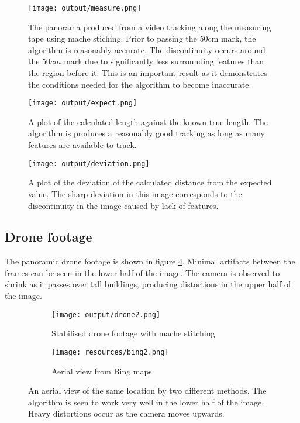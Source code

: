 \begin{figure}
  \centering
  \texttt{[image: output/measure.png]}
  \caption{The panorama produced from a video tracking along the measuring tape using mache stiching.
  Prior to passing the 50cm mark, the algorithm is reasonably accurate.
  The discontinuity occurs around the $50cm$ mark due to significantly less surrounding features than the region before it.
  This is an important result as it demonstrates the conditions needed for the algorithm to become inaccurate.}
  \label{fig:measure}
\end{figure}

\begin{figure}
  \centering
  \texttt{[image: output/expect.png]}
  \caption{A plot of the calculated length against the known true length.
  The algorithm is produces a reasonably good tracking as long as many features are available to track.}
  \label{fig:expect}
\end{figure}

\begin{figure}
  \centering
  \texttt{[image: output/deviation.png]}
  \caption{A plot of the deviation of the calculated distance from the expected value.
  The sharp deviation in this image corresponds to the discontinuity in the image caused by lack of features.}
  \label{fig:deviation}
\end{figure}

\subsection{Drone footage}

The panoramic drone footage is shown in figure \ref{fig:drone}.
Minimal artifacts between the frames can be seen in the lower half of the image.
The camera is observed to shrink as it passes over tall buildings,
producing distortions in the upper half of the image. 

\begin{figure}
  \centering
  \begin{subfigure}[b]{0.7\textwidth}
    \texttt{[image: output/drone2.png]}
    \caption{Stabilised drone footage with mache stitching}
    \label{fig:drone}
  \end{subfigure}
  \begin{subfigure}[b]{0.7\textwidth}
    \texttt{[image: resources/bing2.png]}
    \caption{Aerial view from Bing maps}
    \label{fig:bing}
  \end{subfigure}
	\caption{An aerial view of the same location by two different methods.
  The algorithm is seen to work very well in the lower half of the image.
  Heavy distortions occur as the camera moves upwards.}
\end{figure}
